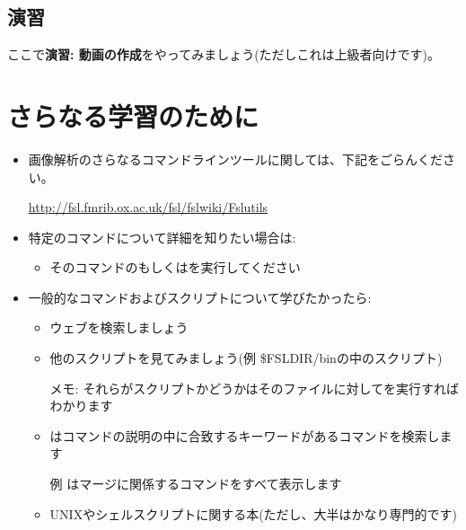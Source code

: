 \documentclass{jsarticle}
\begin{document}
\subsection*{演習}

ここで{\bf 演習: 動画の作成}をやってみましょう(ただしこれは上級者向けです)。


\section{さらなる学習のために}


\begin{itemize}

\item 画像解析のさらなるコマンドラインツールに関しては、下記をごらんください。

{\color{red}\url{http://fsl.fmrib.ox.ac.uk/fsl/fslwiki/Fslutils}}

\item 特定のコマンドについて詳細を知りたい場合は:

	\begin{itemize}
	\item そのコマンドの{\color{red}}もしくは{\color{red}}を実行してください
	\end{itemize}

\item 一般的なコマンドおよびスクリプトについて学びたかったら:

	\begin{itemize}
	\item ウェブを検索しましょう
	\item 他のスクリプトを見てみましょう(例 \$FSLDIR/binの中のスクリプト)

	メモ: それらがスクリプトかどうかはそのファイルに対して{\color{red}}を実行すればわかります

	\item {\color{red}}はコマンドの説明の中に合致するキーワードがあるコマンドを検索します

	例 {\color{red}}はマージに関係するコマンドをすべて表示します

	\item UNIXやシェルスクリプトに関する本(ただし、大半はかなり専門的です)
	\end{itemize}

\end{itemize}
\end{document}
